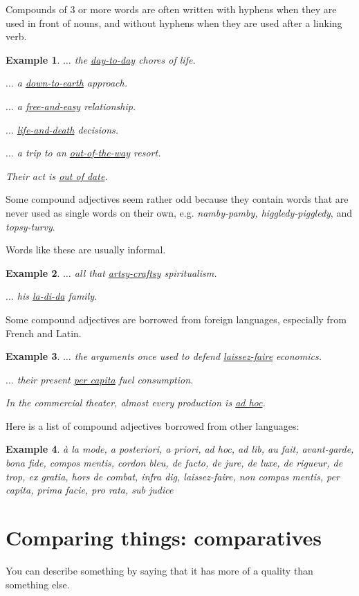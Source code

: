 \documentclass[oneside]{book}
\numberwithin{equation}{section}
\newtheorem{example}{Example}[section]
\begin{document}
Compounds of 3 or more words are often written with hyphens when they are used in front of nouns, and without hyphens when they are used after a linking verb.
\begin{example}
    $\ldots$ the \underline{day-to-day} chores of life.
    
    $\ldots$ a \underline{down-to-earth} approach.
    
    $\ldots$ a \underline{free-and-easy} relationship.
    
    $\ldots$ \underline{life-and-death} decisions.
    
    $\ldots$ a trip to an \underline{out-of-the-way} resort.
    
    Their act is \underline{out of date}.
\end{example}
%
\noindent{} Some compound adjectives seem rather odd because they contain words that are never used as single words on their own, e.g. \textit{namby-pamby, higgledy-piggledy}, and \textit{topsy-turvy}.

Words like these are usually informal.
\begin{example}
    $\ldots$ all that \underline{artsy-craftsy} spiritualism.
    
    $\ldots$ his \underline{la-di-da} family.
\end{example}
%
\noindent{} Some compound adjectives are borrowed from foreign languages, especially from French and Latin.
\begin{example}
    $\ldots$ the arguments once used to defend \underline{laissez-faire} economics.
    
    $\ldots$ their present \underline{per capita} fuel consumption.
    
    In the commercial theater, almost every production is \underline{ad hoc}.
\end{example}
Here is a list of compound adjectives borrowed from other languages:
\begin{example}
    \`a la mode, a posteriori, a priori, ad hoc, ad lib, au fait, avant-garde, bona fide, compos mentis, cordon bleu, de facto, de jure, de luxe, de rigueur, de trop, ex gratia, hors de combat, infra dig, laissez-faire, non compas mentis, per capita, prima facie, pro rata, sub judice
\end{example}

\section{Comparing things: comparatives}
\noindent{} You can describe something by saying that it has more of a quality than something else.
\end{document}
